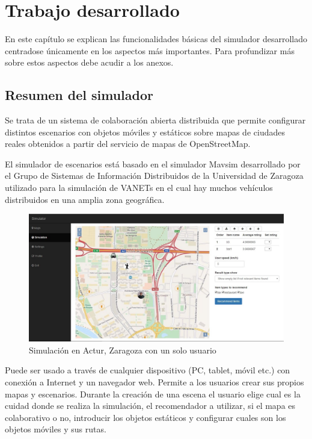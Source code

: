 \chapter{Trabajo desarrollado}


En este capítulo se explican las funcionalidades básicas del simulador desarrollado centradose únicamente en los aspectos más importantes. Para profundizar más sobre estos aspectos debe acudir a los anexos.

\section{Resumen del simulador}


Se trata de un sistema de colaboración abierta distribuida que permite configurar distintos escenarios con objetos móviles y estáticos sobre mapas de ciudades reales obtenidos a partir del servicio de mapas de OpenStreetMap. 

El simulador de escenarios está basado en el simulador Mavsim desarrollado por el Grupo de Sistemas de Información Distribuidos de la Universidad de Zaragoza utilizado para la simulación de VANETs en el cual hay muchos vehículos distribuidos en una amplia zona geográfica.

\begin{figure}[H]
\centering\includegraphics[scale=0.3]{imagenes/resumen-simulador.jpg}
\caption{Simulación en Actur, Zaragoza con un solo usuario}
\label{c2_trama}
\end{figure}

Puede ser usado a través de cualquier dispositivo (PC, tablet, móvil etc.) con conexión a Internet y un navegador web. Permite a los usuarios crear sus propios mapas y escenarios. Durante la creación de una escena el usuario elige cual es la cuidad donde se realiza la simulación, el recomendador a utilizar, si el mapa es colaborativo o no, introducir los objetos estáticos y configurar cuales son los objetos móviles y sus rutas. 

